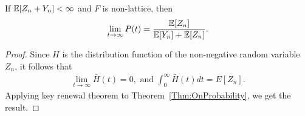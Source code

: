 \documentclass[a4paper,10pt,english]{article}
\begin{document}
\begin{cor}
\label{cor:LimitingOnProbability}
If $\mathbb{E}[Z_n+Y_n]< \infty $ and $F$ is non-lattice, then 
\begin{equation*}
\lim_{t \to \infty}P(t)=\frac{\mathbb{E}[Z_n]}{\mathbb{E}[Y_n]+\mathbb{E}[Z_n]}.
\end{equation*}
\end{cor}
\begin{proof} Since $H$ is the distribution function of the non-negative random variable $Z_n$, it follows that 
\begin{align*}
\lim_{t \to \infty}\bar{H}(t) = 0, \text{ and } \int_0^\infty \bar{H}(t)dt = E[Z_n].
\end{align*}
Applying key renewal theorem to Theorem~\ref{Thm:OnProbability}, we get the result.
\end{proof}
\end{document}
